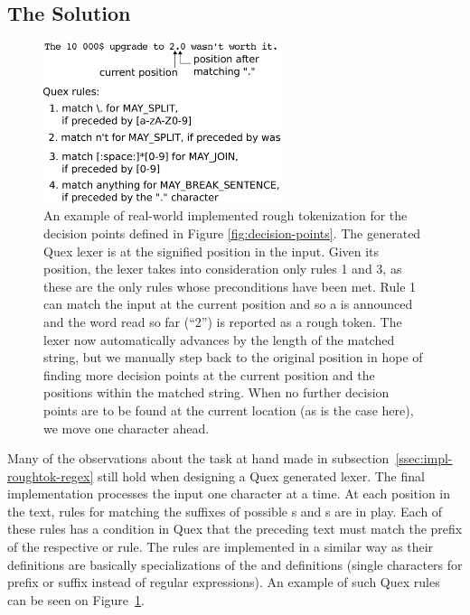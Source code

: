 \subsection{The Solution}
\label{ssec:impl-roughtok-solution}

\begin{figure}
  \includegraphics[width=0.618033988\textwidth]{img/quexexample.eps}
  \caption{An example of real-world implemented rough tokenization for the
           decision points defined in Figure \ref{fig:decision-points}. The
           generated Quex lexer is at the signified position in the input.
           Given its position, the lexer takes into consideration only rules
           1 and 3, as these are the only rules whose preconditions have been
           met. Rule 1 can match the input at the current position and so a
           \maysplit{} is announced and the word read so far (``2'') is
           reported as a rough token. The lexer now automatically advances by
           the length of the matched string, but we manually step back to the
           original position in hope of finding more decision points at the
           current position and the positions within the matched string. When
           no further decision points are to be found at the current location
           (as is the case here), we move one character ahead.}
  \label{fig:quex-example}
\end{figure}

Many of the observations about the task at hand made in
subsection~\ref{ssec:impl-roughtok-regex} still hold when designing a Quex
generated lexer. The final implementation processes the input one character at
a time. At each position in the text, rules for matching the suffixes of
possible \maysplit{}s and \mayjoin{}s are in play. Each of these rules has a
condition in Quex that the preceding text must match the prefix of the
respective \maysplit{} or \mayjoin{} rule. The \maybreaksentence{} rules
are implemented in a similar way as their definitions are basically
specializations of the \maysplit{} and \mayjoin{} definitions (single
characters for prefix or suffix instead of regular expressions). An example of
such Quex rules can be seen on Figure~\ref{fig:quex-example}.

